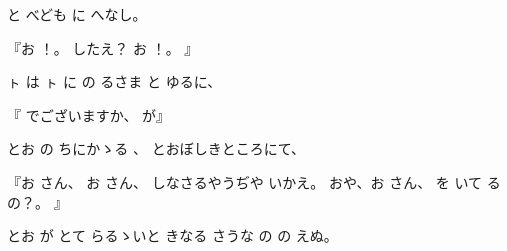 と
べども
に
へなし。

『お
！。
したえ？
お
！。
』

ㇳ
は
ㇳ
に
の
るさま
と
ゆるに、

『
でございますか、
が』

とお
の
ちにかゝる
、
とおぼしきところにて、

『お
さん、
お
さん、
しなさるやうぢや
いかえ。
おや、お
さん、
を
いて
るの？。
』

とお
が
とて
らるゝいと
きなる
さうな
の
の
えぬ。


